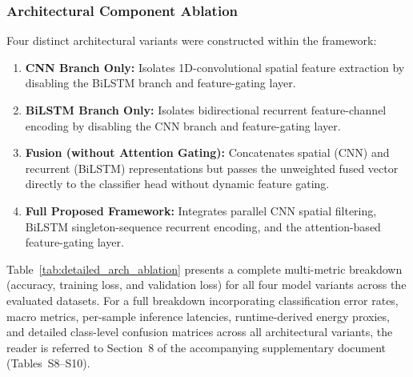 \documentclass[a4paper,fleqn]{cas-sc}
\begin{document}
\subsubsection{Architectural Component Ablation}
Four distinct architectural variants were constructed within the framework:
\begin{enumerate}
    \item \textbf{CNN Branch Only:} Isolates 1D-convolutional spatial feature extraction by disabling the BiLSTM branch and feature-gating layer.
    \item \textbf{BiLSTM Branch Only:} Isolates bidirectional recurrent feature-channel encoding by disabling the CNN branch and feature-gating layer.
    \item \textbf{Fusion (without Attention Gating):} Concatenates spatial (CNN) and recurrent (BiLSTM) representations but passes the unweighted fused vector directly to the classifier head without dynamic feature gating.
    \item \textbf{Full Proposed Framework:} Integrates parallel CNN spatial filtering, BiLSTM singleton-sequence recurrent encoding, and the attention-based feature-gating layer.
\end{enumerate}

Table~\ref{tab:detailed_arch_ablation} presents a complete multi-metric breakdown (accuracy, training loss, and validation loss) for all four model variants across the evaluated datasets. For a full breakdown incorporating classification error rates, macro metrics, per-sample inference latencies, runtime-derived energy proxies, and detailed class-level confusion matrices across all architectural variants, the reader is referred to Section~8 of the accompanying supplementary document (Tables~S8--S10).
\end{document}

